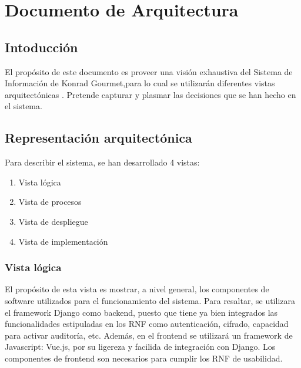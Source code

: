 \documentclass[letterpaper,10pt,spanish]{sphinxmanual}
\begin{document}
\chapter{Documento de Arquitectura}
\label{\detokenize{SAD:documento-de-arquitectura}}\label{\detokenize{SAD::doc}}

\section{Intoducción}
\label{\detokenize{SAD:intoduccion}}
\sphinxAtStartPar
El propósito de este documento es proveer una visión
exhaustiva del Sistema de Información de Konrad Gourmet,para
lo cual se utilizarán diferentes vistas arquitectónicas
. Pretende capturar y plasmar las decisiones que se han
hecho en el sistema.


\section{Representación arquitectónica}
\label{\detokenize{SAD:representacion-arquitectonica}}
\sphinxAtStartPar
Para describir el sistema, se han desarrollado
4 vistas:
\begin{enumerate}
%
\item {} 
\sphinxAtStartPar
Vista lógica

\item {} 
\sphinxAtStartPar
Vista de procesos

\item {} 
\sphinxAtStartPar
Vista de despliegue

\item {} 
\sphinxAtStartPar
Vista de implementación

\end{enumerate}


\subsection{Vista lógica}
\label{\detokenize{SAD:vista-logica}}
\sphinxAtStartPar
El propósito de esta vista es mostrar, a nivel general,
los componentes de software utilizados para el
funcionamiento del sistema. Para resaltar, se
utilizara el framework Django como backend, puesto
que tiene ya bien integrados las funcionalidades estipuladas
en los RNF como autenticación, cifrado, capacidad para
activar auditoría, etc. Además, en el front\sphinxhyphen{}end se utilizará
un framework de Javascript: Vue.js, por su ligereza y
facilida de integración con Django. Los componentes de
front\sphinxhyphen{}end son necesarios para cumplir los RNF de usabilidad.
\end{document}
